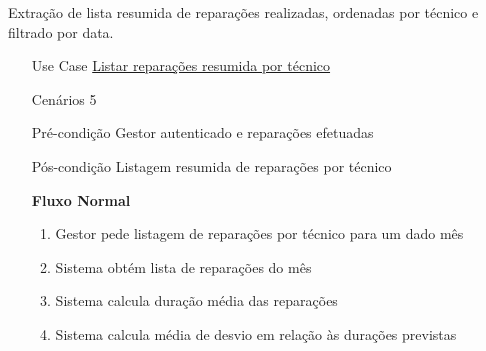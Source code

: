 \documentclass[../relatorio.tex]{subfiles}
\begin{document}
Extração de lista resumida de reparações realizadas, ordenadas por técnico e filtrado por data.
\begin{itemize}
    \item[Use Case] {\underline{Listar reparações resumida por técnico}}
    \item[Cenários] {5}
    \item[Pré-condição] {Gestor autenticado e reparações efetuadas}
    \item[Pós-condição] {Listagem resumida de reparações por técnico}
          \begin{flushleft}
              \textbf{Fluxo Normal}
          \end{flushleft}
          \begin{enumerate}
              \item Gestor pede listagem de reparações por técnico para um dado mês
              \item Sistema obtém lista de reparações do mês
              \item Sistema calcula duração média das reparações
              \item Sistema calcula média de desvio em relação às durações previstas
          \end{enumerate}
\end{itemize}
\end{document}
